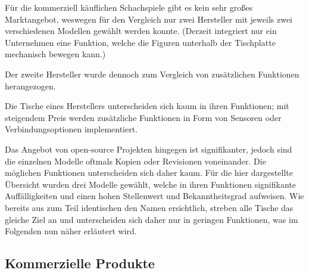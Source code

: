 Für die kommerziell käuflichen Schachspiele gibt es kein sehr großes
Marktangebot, weswegen für den Vergleich nur zwei Hersteller mit jeweils
zwei verschiedenen Modellen gewählt werden konnte. (Derzeit integriert
nur ein Unternehmen eine Funktion, welche die Figuren unterhalb der
Tischplatte mechanisch bewegen kann.)

Der zweite Hersteller wurde dennoch zum Vergleich von zusätzlichen
Funktionen herangezogen.

Die Tische eines Herstellers unterscheiden sich kaum in ihren
Funktionen; mit steigendem Preis werden zusätzliche Funktionen in Form
von Sensoren oder Verbindungsoptionen implementiert.

Das Angebot von open-source Projekten hingegen ist signifikanter, jedoch
sind die einzelnen Modelle oftmals Kopien oder Revisionen voneinander.
Die möglichen Funktionen unterscheiden sich daher kaum. Für die hier
dargestellte Übersicht wurden drei Modelle gewählt, welche in ihren
Funktionen signifikante Auffälligkeiten und einen hohen Stellenwert und
Bekanntheitsgrad aufweisen. Wie bereits aus zum Teil identischen den
Namen ersichtlich, streben alle Tische das gleiche Ziel an und
unterscheiden sich daher nur in geringen Funktionen, was im Folgenden
nun näher erläutert wird.

\hypertarget{kommerzielle-produkte}{%
\subsection{Kommerzielle Produkte}\label{kommerzielle-produkte}}

